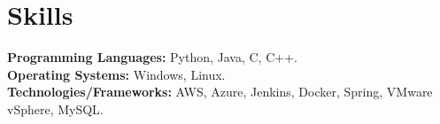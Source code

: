 \documentclass[a4paper,12pt]{article}
\begin{document}
\section{Skills}
\noindent\textbf{Programming Languages:} Python, Java, C, C++. \\[3.75pt]
\noindent\textbf{Operating Systems:} Windows, Linux. \\[3.75pt]
\noindent\textbf{Technologies/Frameworks:} AWS, Azure, Jenkins, Docker, Spring, VMware vSphere, MySQL.
\vfill
{}
\end{document}
